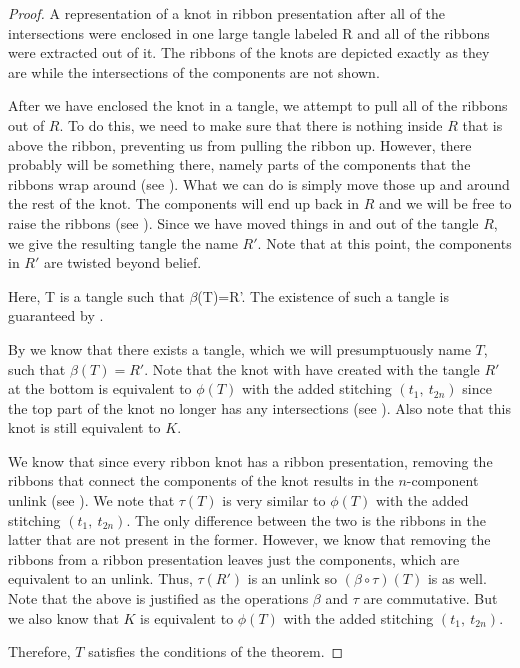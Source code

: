 \begin{paper}
\begin{proof}
{A representation of a knot in ribbon presentation after all of the
intersections were enclosed in one large tangle labeled R and all of the ribbons
were extracted out of it.
The ribbons of the knots are depicted exactly as they are while the
intersections of the components are not shown.}

After we have enclosed the knot in a tangle, we attempt to pull all of the
ribbons out of $R$.
To do this, we need to make sure that there is nothing inside $R$ that is above
the ribbon, preventing us from pulling the ribbon up.
However, there probably will be something there, namely parts of the components
that the ribbons wrap around (see \figPresentation).
What we can do is simply move those up and around the rest of the knot.
The components will end up back in $R$ and we will be free to raise the ribbons
(see \figTwisted).
Since we have moved things in and out of the tangle $R$, we give the resulting
tangle the name $R'$.
Note that at this point, the components in $R'$ are twisted beyond belief.

{Here, T is a tangle such that $\beta$(T)=R'.
The existence of such a tangle is guaranteed by \lemTangles.}

By \lemTangles we know that there exists a tangle, which we will presumptuously
name $T$, such that $\beta(T)=R'$.
Note that the knot with have created with the tangle $R'$ at the bottom is
equivalent to $\phi(T)$ with the added stitching $(t_1,~t_{2n})$ since the top
part of the knot no longer has any intersections (see \figFinal).
Also note that this knot is still equivalent to $K$.

We know that since every ribbon knot has a ribbon presentation, removing the
ribbons that connect the components of the knot results in the $n$-component
unlink (see \figPresentation).
We note that $\tau(T)$ is very similar to $\phi(T)$ with the added stitching
$(t_1,~t_{2n})$.
The only difference between the two is the ribbons in the latter that are not
present in the former.
However, we know that removing the ribbons from a ribbon presentation leaves
just the components, which are equivalent to an unlink.
Thus, $\tau(R')$ is an unlink so $(\beta\circ\tau)(T)$ is as well.
Note that the above is justified as the operations $\beta$ and $\tau$ are
commutative.
But we also know that $K$ is equivalent to $\phi(T)$ with the added stitching
$(t_1,~t_{2n})$.

Therefore, $T$ satisfies the conditions of the theorem.
\end{proof}


\end{paper}
